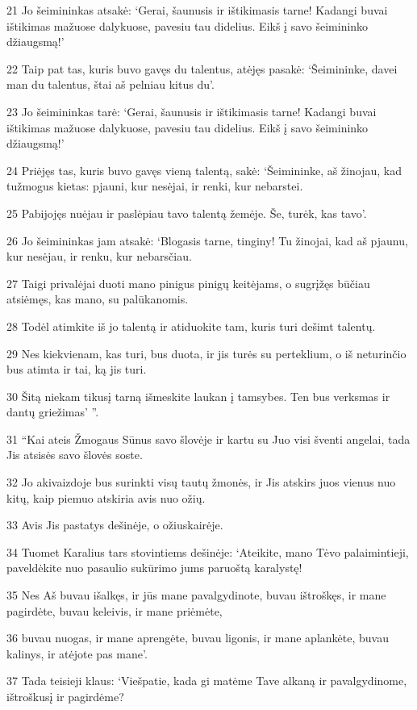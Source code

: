 \par 21 Jo šeimininkas atsakė: ‘Gerai, šaunusis ir ištikimasis tarne! Kadangi buvai ištikimas mažuose dalykuose, pavesiu tau didelius. Eikš į savo šeimininko džiaugsmą!’ 
\par 22 Taip pat tas, kuris buvo gavęs du talentus, atėjęs pasakė: ‘Šeimininke, davei man du talentus, štai aš pelniau kitus du’. 
\par 23 Jo šeimininkas tarė: ‘Gerai, šaunusis ir ištikimasis tarne! Kadangi buvai ištikimas mažuose dalykuose, pavesiu tau didelius. Eikš į savo šeimininko džiaugsmą!’ 
\par 24 Priėjęs tas, kuris buvo gavęs vieną talentą, sakė: ‘Šeimininke, aš žinojau, kad tu­žmogus kietas: pjauni, kur nesėjai, ir renki, kur nebarstei. 
\par 25 Pabijojęs nuėjau ir paslėpiau tavo talentą žemėje. Še, turėk, kas tavo’. 
\par 26 Jo šeimininkas jam atsakė: ‘Blogasis tarne, tinginy! Tu žinojai, kad aš pjaunu, kur nesėjau, ir renku, kur nebarsčiau. 
\par 27 Taigi privalėjai duoti mano pinigus pinigų keitėjams, o sugrįžęs būčiau atsiėmęs, kas mano, su palūkanomis. 
\par 28 Todėl atimkite iš jo talentą ir atiduokite tam, kuris turi dešimt talentų. 
\par 29 Nes kiekvienam, kas turi, bus duota, ir jis turės su perteklium, o iš neturinčio bus atimta ir tai, ką jis turi. 
\par 30 Šitą niekam tikusį tarną išmeskite laukan į tamsybes. Ten bus verksmas ir dantų griežimas’ ”. 
\par 31 “Kai ateis Žmogaus Sūnus savo šlovėje ir kartu su Juo visi šventi angelai, tada Jis atsisės savo šlovės soste. 
\par 32 Jo akivaizdoje bus surinkti visų tautų žmonės, ir Jis atskirs juos vienus nuo kitų, kaip piemuo atskiria avis nuo ožių. 
\par 33 Avis Jis pastatys dešinėje, o ožius­kairėje. 
\par 34 Tuomet Karalius tars stovintiems dešinėje: ‘Ateikite, mano Tėvo palaimintieji, paveldėkite nuo pasaulio sukūrimo jums paruoštą karalystę! 
\par 35 Nes Aš buvau išalkęs, ir jūs mane pavalgydinote, buvau ištroškęs, ir mane pagirdėte, buvau keleivis, ir mane priėmėte, 
\par 36 buvau nuogas, ir mane aprengėte, buvau ligonis, ir mane aplankėte, buvau kalinys, ir atėjote pas mane’. 
\par 37 Tada teisieji klaus: ‘Viešpatie, kada gi matėme Tave alkaną ir pavalgydinome, ištroškusį ir pagirdėme? 
